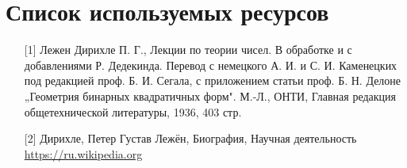 \chapter{Список используемых ресурсов}

\begin{enumerate}
\item[{[1]}] Лежен Дирихле П. Г., Лекции по теории чисел. В обработке и с добавлениями Р. Дедекинда. Перевод с немецкого А. И. и С. И. Каменецких под редакцией проф. Б. И. Сегала, с приложением статьи проф. Б. Н. Делоне „Геометрия бинарных квадратичных форм". М.-Л., ОНТИ, Главная редакция общетехнической литературы, 1936, 403 стр.
\item[{[2]}] Дирихле, Петер Густав Лежён, Биография, Научная деятельность \url{https://ru.wikipedia.org}

\end{enumerate}

